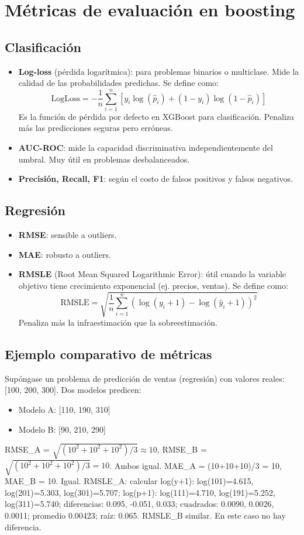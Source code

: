 \documentclass[12pt,a4paper,openany,oneside]{book}
\begin{document}
\section{Métricas de evaluación en boosting}

\subsection{Clasificación}
\begin{itemize}
    \item \textbf{Log-loss} (pérdida logarítmica): para problemas binarios o multiclase. Mide la calidad de las probabilidades predichas. Se define como:
    \[
    \text{LogLoss} = -\frac{1}{n} \sum_{i=1}^n \left[ y_i \log(\hat{p}_i) + (1-y_i) \log(1-\hat{p}_i) \right]
    \]
    Es la función de pérdida por defecto en XGBoost para clasificación. Penaliza más las predicciones seguras pero erróneas.
    \item \textbf{AUC-ROC}: mide la capacidad discriminativa independientemente del umbral. Muy útil en problemas desbalanceados.
    \item \textbf{Precisión, Recall, F1}: según el costo de falsos positivos y falsos negativos.
\end{itemize}

\subsection{Regresión}
\begin{itemize}
    \item \textbf{RMSE}: sensible a outliers.
    \item \textbf{MAE}: robusto a outliers.
    \item \textbf{RMSLE} (Root Mean Squared Logarithmic Error): útil cuando la variable objetivo tiene crecimiento exponencial (ej. precios, ventas). Se define como:
    \[
    \text{RMSLE} = \sqrt{\frac{1}{n} \sum_{i=1}^n (\log(y_i+1) - \log(\hat{y}_i+1))^2}
    \]
    Penaliza más la infraestimación que la sobreestimación.
\end{itemize}

\subsection{Ejemplo comparativo de métricas}
Supóngase un problema de predicción de ventas (regresión) con valores reales: [100, 200, 300]. Dos modelos predicen:
\begin{itemize}
    \item Modelo A: [110, 190, 310]
    \item Modelo B: [90, 210, 290]
\end{itemize}
RMSE_A = \(\sqrt{(10^2+10^2+10^2)/3} \approx 10\), RMSE_B = \(\sqrt{(10^2+10^2+10^2)/3} = 10\). Ambos igual.
MAE_A = (10+10+10)/3 = 10, MAE_B = 10. Igual.
RMSLE_A: calcular log(y+1): log(101)=4.615, log(201)=5.303, log(301)=5.707; log(p+1): log(111)=4.710, log(191)=5.252, log(311)=5.740; diferencias: 0.095, -0.051, 0.033; cuadrados: 0.0090, 0.0026, 0.0011; promedio 0.00423; raíz: 0.065. RMSLE_B similar. En este caso no hay diferencia.
\end{document}
